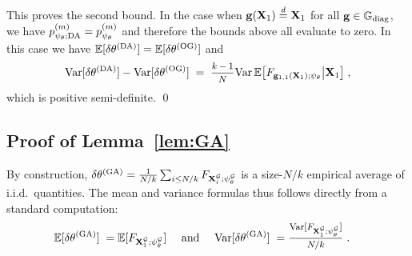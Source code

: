 This proves the second bound. In the case when $\mathbf{g}(\mathbf{X}_1) \overset{d}{=} \mathbf{X}_1$ for all $\mathbf{g} \in \mathbb{G}_{\text{\rm diag}}$, we have $p^{(m)}_{\psi_\theta; {\rm DA}} = p^{(m)}_{\psi_\theta}$ and therefore the bounds above all evaluate to zero. In this case we have $\mathbb{E}[ \delta \theta^{(\rm DA)}] = \mathbb{E}[\delta \theta^{(\rm OG)}]$ and 
\begin{align*}
    \Var[ \delta  \theta^{(\rm DA)}] - \Var[ 
        \delta \theta^{(\rm OG)}] \;=\;  \mfrac{k-1}{N} 
    \Var \, \mean\big[ F_{\bg_{1,1}(\bX_1); \psi_\theta} \big| \bX_1 \big]\;,
\end{align*}
which is positive semi-definite. \qed

\subsection{Proof of Lemma~\ref{lem:GA}}

By construction, $\delta \theta^{(\rm GA)} = \frac{1}{N / k} \sum_{i \leq N/k} F_{\mathbf{X}^{\mathcal{G}}_i; \psi^{\mathcal{G}}_\theta}$ is a size-$N/k$ empirical average of i.i.d.~quantities. The mean and variance formulas thus follows directly from a standard computation:
\begin{align*}
    \mean[ \delta \theta^{(\rm GA)} ]
    \;=&\;
    \mean[  F_{\bX^\cG_1; \psi^\cG_\theta}  ]
    &\text{ and }&&
    \Var[\delta \theta^{(\rm GA)}]
    \;=&\;
    \mfrac{\Var[  F_{\bX^\cG_1; \psi^\cG_\theta}  ]}{N/k}
    \;. \qedhere
\end{align*}

